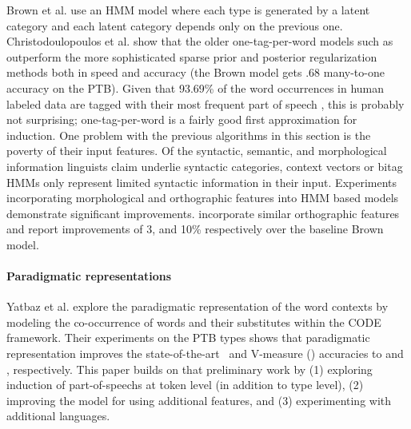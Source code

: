 Brown et al.  use an HMM model
where each type is generated by a latent category and each latent
category depends only on the previous one.  Christodoulopoulos et
al.  show that
the older one-tag-per-word models such as
\cite{Brown:1992:CNG:176313.176316} outperform the more sophisticated
sparse prior
\cite{goldwater-griffiths:2007:ACLMain,johnson:2007:EMNLP-CoNLL2007}
and posterior regularization methods
\cite{Ganchev:2010:PRS:1859890.1859918} both in speed and accuracy
(the Brown model gets .68 many-to-one accuracy on the PTB).  Given
that 93.69\% of the word occurrences in human labeled data are tagged
with their most frequent part of speech
\cite{Toutanova:2003:FPT:1073445.1073478}, this is probably not
surprising; one-tag-per-word is a fairly good first approximation for
induction.  One problem with the previous algorithms in this section
is the poverty of their input features.  Of the syntactic, semantic,
and morphological information linguists claim underlie syntactic
categories, context vectors or bitag HMMs only represent limited
syntactic information in their input.  Experiments incorporating
morphological and orthographic features into HMM based models
demonstrate significant improvements.
\cite{Clark:2003:CDM:1067807.1067817,blunsom-cohn:2011:ACL-HLT2011}
incorporate similar orthographic features and report improvements of
3, and 10\% respectively over the baseline Brown model.

\paragraph{Paradigmatic representations}

Yatbaz et al.  explore
the paradigmatic representation of the word contexts by modeling the
co-occurrence of words and their substitutes within the CODE
framework.  Their experiments on the PTB types shows that paradigmatic
representation improves the state-of-the-art \mto\ and V-measure (\vm)
accuracies to \fmto and \ftvm, respectively.  This paper builds on
that preliminary work by (1) exploring induction of part-of-speechs at
token level (in addition to type level), (2) improving the model for
using additional features, and (3) experimenting with additional
languages.

